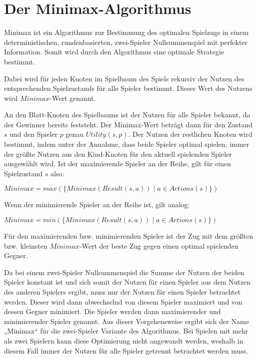 \section{Der Minimax-Algorithmus}
\label{sec:minimax}

Minimax ist ein Algorithmus zur Bestimmung des optimalen Spielzugs in einem deterministischen, rundenbasierten,
zwei-Spieler Nullsummenspiel mit perfekter Information. Somit wird durch den Algorithmus eine optimale Strategie
bestimmt.

Dabei wird für jeden Knoten im Spielbaum des Spiels rekursiv der Nutzen des entsprechenden Spielzustands für alle
Spieler bestimmt. Dieser Wert des Nutzens wird $Minimax$-Wert genannt.

An den Blatt-Knoten des Spielbaums ist der Nutzen für alle Spieler bekannt, da der Gewinner bereits feststeht. Der
Minimax-Wert beträgt dann für den Zustand $s$ und den Spieler $p$ genau $Utility(s, p)$. Der Nutzen der restlichen Knoten
wird bestimmt, indem unter der Annahme, dass beide Spieler optimal spielen, immer der größte Nutzen aus den Kind-Knoten
für den aktuell spielenden Spieler ausgewählt wird. Ist der maximierende Spieler an der Reihe, gilt für einen
Spielzustand $s$ also:

\hspace*{1.3cm}
$Minimax=max(\{Minimax(Result(s, a)) \mid a \in Actions(s)\})$

Wenn der minimierende Spieler an der Reihe ist, gilt analog:

\hspace*{1.3cm}
$Minimax=min(\{Minimax(Result(s, a)) \mid a \in Actions(s)\})$

Für den maximierenden bzw. minimierenden Spieler ist der Zug mit dem größten bzw. kleinsten $Minimax$-Wert der beste Zug
gegen einen optimal spielenden Gegner.
\cite[S.~164f.]{ai2010russel}

Da bei einem zwei-Spieler Nullsummenspiel die Summe der Nutzen der beiden Spieler konstant ist und sich somit der
Nutzen für einen Spieler aus dem Nutzen des anderen Spielers ergibt, muss nur der Nutzen für einen Spieler betrachtet
werden. Dieser wird dann abwechselnd von diesem Spieler maximiert und von dessen Gegner minimiert. Die Spieler werden
dann maximierender und minimierender Spieler genannt. Aus dieser Vorgehensweise ergibt sich der Name „Minimax“
für die zwei-Spieler Variante des Algorithmus. Bei Spielen mit mehr als zwei Spielern kann diese Optimierung nicht
angewandt werden, weshalb in diesem Fall immer der Nutzen für alle Spieler getrennt betrachtet werden muss.
\cite[S.~165]{ai2010russel}
